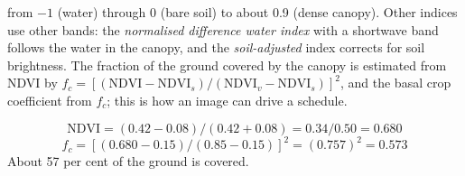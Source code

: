 from $-1$ (water) through 0 (bare soil) to about 0.9 (dense canopy). Other indices use other bands: the \emph{normalised difference water index} with a shortwave band follows the water in the canopy, and the \emph{soil-adjusted} index corrects for soil brightness. The fraction of the ground covered by the canopy is estimated from NDVI by $f_c=[(\mathrm{NDVI}-\mathrm{NDVI}_s)/(\mathrm{NDVI}_v-\mathrm{NDVI}_s)]^2$, and the basal crop coefficient from $f_c$; this is how an image can drive a schedule.

\sol {}\ans \[\mathrm{NDVI}=(0.42-0.08)/(0.42+0.08)=0.34/0.50=0.680\] \ans \[f_c=[(0.680-0.15)/(0.85-0.15)]^2=(0.757)^2=0.573\] \ans About 57 per cent of the ground is covered. \finans

